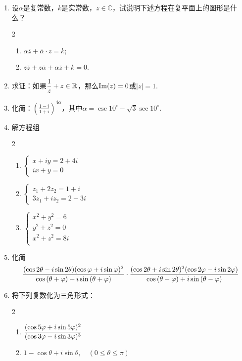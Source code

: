 \begin{enumerate}
\item 设$\alpha$是复常数，$k$是实常数，$z\in\mathbb{C}$，试说明下述方程在复平面上的图形是什么？
\begin{multicols}{2}
\begin{enumerate}[(1)]
    \item $\alpha\bar z+\bar\alpha\cdot z=k$;
    \item $z\bar z+z\bar\alpha+\alpha\bar z+k=0$.
\end{enumerate}
\end{multicols}
\item 求证：如果$\dfrac{1}{z}+z\in\mathbb{R}$，那么${\rm Im}(z)=0$或$|z|=1$.
\item 化简：$\left(\frac{1-i}{1+i}\right)^{4\alpha}$，其中$\alpha=\csc10^{\circ}-\sqrt{3}\sec10^{\circ}$.
\item 解方程组
\begin{multicols}{2}
\begin{enumerate}[(1)]
    \item $\begin{cases}
        x+iy=2+4i\\ ix+y=0
    \end{cases}$
    \item $\begin{cases}
        z_1+2z_2=1+i\\  3z_1+iz_2=2-3i
    \end{cases}$
    \item $\begin{cases}
x^2+y^2=6\\        
y^2+z^2=0\\
x^2+z^2=8i\\       
    \end{cases}$
\end{enumerate}
\end{multicols}

\item 化简
\[\dfrac{(\cos2\theta-i\sin2\theta)(\cos{\varphi}+i\sin{\varphi})^2}{\cos\left(\theta+\varphi\right)+i\sin\left(\theta+\varphi\right)}\cdot \dfrac{(\cos{2\theta}+i\sin{2\theta})^2(\cos2\varphi-i\sin2\varphi)}{\cos\left(\theta-\varphi\right)+i\sin\left(\theta-\varphi\right)}\]

\item 将下列复数化为三角形式：
\begin{multicols}{2}
\begin{enumerate}[(1)]
    \item $\dfrac{(\cos{5\varphi}+i\sin{5\varphi})^2}{(\cos3\varphi-i\sin3\varphi)^3}$
    \item $1-\cos\theta+i\sin\theta,\quad (0\le\theta\le\pi)$
\end{enumerate}
\end{multicols}


\end{enumerate}
